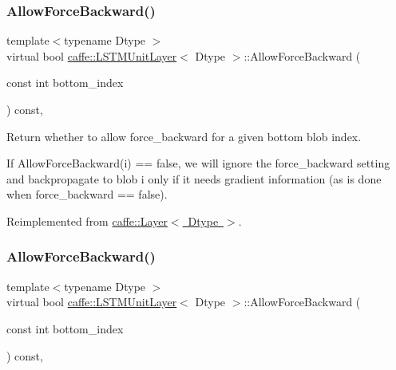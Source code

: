 \subsubsection{\texorpdfstring{Allow\+Force\+Backward()}{AllowForceBackward()}\hspace{0.1cm}{\footnotesize\ttfamily [1/2]}}
{\footnotesize\ttfamily template$<$typename Dtype $>$ \\
virtual bool \mbox{\hyperlink{classcaffe_1_1_l_s_t_m_unit_layer}{caffe\+::\+L\+S\+T\+M\+Unit\+Layer}}$<$ Dtype $>$\+::Allow\+Force\+Backward (\begin{DoxyParamCaption}\item[{const int}]{bottom\+\_\+index }\end{DoxyParamCaption}) const\hspace{0.3cm}{\ttfamily [inline]}, {\ttfamily [virtual]}}



Return whether to allow force\+\_\+backward for a given bottom blob index. 

If Allow\+Force\+Backward(i) == false, we will ignore the force\+\_\+backward setting and backpropagate to blob i only if it needs gradient information (as is done when force\+\_\+backward == false). 

Reimplemented from \mbox{\hyperlink{classcaffe_1_1_layer_a1c0b2bffcd6d57e4bd49f820941badb6}{caffe\+::\+Layer$<$ Dtype $>$}}.

\mbox{\label{classcaffe_1_1_l_s_t_m_unit_layer_a9c46167bc8b96b28196bc24a5515b531}} 
\subsubsection{\texorpdfstring{Allow\+Force\+Backward()}{AllowForceBackward()}\hspace{0.1cm}{\footnotesize\ttfamily [2/2]}}
{\footnotesize\ttfamily template$<$typename Dtype $>$ \\
virtual bool \mbox{\hyperlink{classcaffe_1_1_l_s_t_m_unit_layer}{caffe\+::\+L\+S\+T\+M\+Unit\+Layer}}$<$ Dtype $>$\+::Allow\+Force\+Backward (\begin{DoxyParamCaption}\item[{const int}]{bottom\+\_\+index }\end{DoxyParamCaption}) const\hspace{0.3cm}{\ttfamily [inline]}, {\ttfamily [virtual]}}



